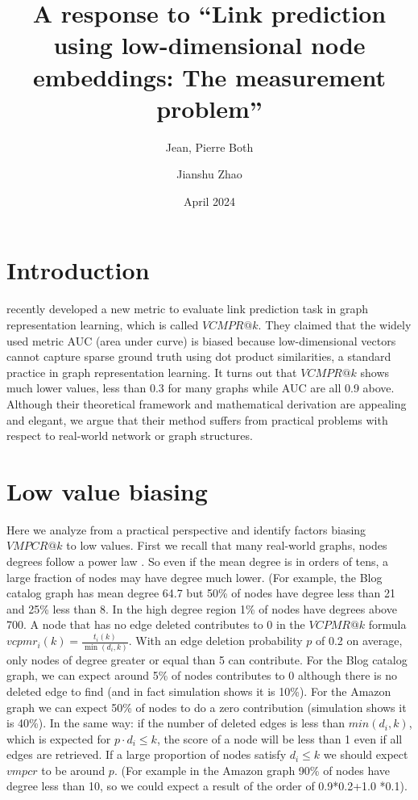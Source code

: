 \documentclass{article}
\title{A response to “Link prediction using low-dimensional node embeddings:
The measurement problem”}
\author[1,*]{Jean, Pierre Both}
\author[2]{Jianshu Zhao}
\affil[1]{Université Paris-Saclay, CEA, List, Palaiseau, France. (Retired)}
\affil[2]{Center for Bioinformatics and Computational Genomics, Georgia Institute of Technology, Atlanta, Georgia, USA}
\affil[*]{Corresponding author : jeanpierre.both@gmail.com}
\date{April 2024}
\begin{document}
\maketitle

\section{Introduction}

\citet{Menand} recently developed a new metric to evaluate link prediction task in graph representation learning, which is called $VCMPR@k$.
They claimed that the widely used metric AUC (area under curve) is biased because low-dimensional vectors cannot capture sparse ground truth using dot product similarities, a standard practice in graph representation learning.
It turns out that $VCMPR@k$ shows much lower values, less than 0.3 for many graphs while AUC are all 0.9 above. Although their theoretical framework and mathematical derivation are appealing and elegant, we argue that their method suffers from practical problems with respect to real-world network or graph structures.


\section{Low value biasing}

Here we analyze from a practical perspective and identify factors biasing $VMPCR@k$ to low values.
First we recall that many real-world graphs,
nodes degrees follow a power law .
So even if the mean degree is in orders of tens, a large fraction of nodes may have degree much lower.
(For example, the Blog catalog graph has mean degree 64.7 but 50\% of nodes have degree less than 21 and 25\% less than 8. In the high degree region 1\% of nodes have degrees above 700.
A node that has no edge deleted contributes to 0 in the $VCPMR@k$ formula $ vcpmr_{i}(k)= \frac{t_{i}(k)}{\min(d_{i},k)}$. With an edge deletion probability $p$ of 0.2 on average, only nodes of degree greater or equal than 5 can contribute. For the Blog catalog graph, we can expect around 5\% of nodes contributes to 0 although there is no deleted edge to find (and in fact simulation shows it is 10\%).
For the Amazon graph we can expect 50\% of nodes to do a zero contribution (simulation shows it is 40\%).
In the same way: if the number of deleted edges is less than $min(d_{i},k)$, which is expected for $p \cdot d_{i} \leq k$, the score of a node will be less than 1 even if all edges are retrieved.
If a large proportion of nodes satisfy $d_{i} \le k$ we should expect $vmpcr$ to be around $p$. (For example in the Amazon graph 90\% of nodes have degree less than 10, so we could expect a result of the order of 0.9*0.2+1.0 *0.1).\\
\end{document}
